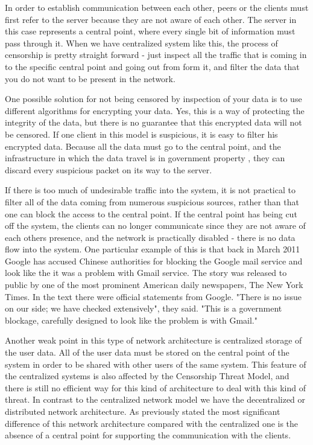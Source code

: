 In order to establish communication between each other, peers or the clients must first refer to the server because they are not aware of each other. The server in this case represents a central point, where every single bit of information must pass through it. When we have centralized system like this, the process of censorship is pretty straight forward - just inspect all the traffic that is coming in to the specific central point and going out from form it, and filter the data that you do not want to be present in the network. 

One possible solution for not being censored by inspection of your data is to use different algorithms for encrypting your data. Yes, this is a way of protecting the integrity of the data, but there is no guarantee that this encrypted data will not be censored. If one client in this model is suspicious, it is easy to filter his encrypted data. Because all the data must go to the central point, and the infrastructure in which the data travel is in government property \cite{dianotti2011}, they can discard every suspicious packet on its way to the server.

If there is too much of undesirable traffic into the system, it is not practical to filter all of the data coming from numerous suspicious sources, rather than that one can block the access to the central point. If the central point has being cut off the system, the clients can no longer communicate since they are not aware of each others presence, and the network is practically disabled - there is no data flow into the system. One particular example of this is that back in March 2011 Google has accused Chinese authorities for blocking the Google mail service and look like the it was a problem with Gmail service. The story was released to public by one of the most prominent American daily newspapers, The New York Times. In the text there were official statements from Google. "There is no issue on our side; we have checked extensively", they said. "This is a government blockage, carefully designed to look like the problem is with Gmail." \cite{web:newyorktimes}

Another weak point in this type of network architecture is centralized storage of the user data. All of the user data must be stored on the central point of the system in order to be shared with other users of the same system. This feature of the centralized systems is also affected by the Censorship Threat Model, and there is still no efficient way for this kind of architecture to deal with this kind of threat.
In contrast to the centralized network model we have the decentralized or distributed network architecture. As previously stated the most significant difference of this network architecture compared with the centralized one is the absence of a central point for supporting the communication with the clients. 


